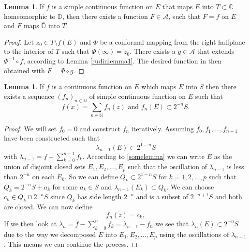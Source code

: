 \documentclass[a4paper,12pt,twoside,BCOR=10mm]{scrbook}
\theoremstyle{definition}
\theoremstyle{definition}
\newtheorem{lemma}[theorem]{Lemma}
\theoremstyle{definition}
\begin{document}
\begin{lemma}
\label{rudinlemma2}
If $f$ is a simple continuous function on $E$ that maps $E$ into $T \subset \mathbb{C}$ homeomorphic to $\overline{\mathbb{D}}$, then there exists a function $F \in \mathcal{A}$, such that $F = f$ on $E$ and $F$ maps $\overline{\mathbb{D}}$ into $T$.
\end{lemma}
\begin{proof}
Let $z_0 \in T \setminus f(E)$ and $\Phi$ be a conformal mapping from the right halfplane to the interior of $T$ such that $\Phi(\infty) = z_0$.
There exists a $g \in \mathcal{A}$ that extends $\Phi^{-1} \circ f$, according to Lemma \ref{rudinlemma1}.
The desired function in then obtained with $F = \Phi \circ g$.
\end{proof}
\begin{lemma}
\label{rudinlemma3}
If $f$ is a continuous function on $E$ which maps $E$ into $S$ then there exists a sequence $(f_n)_{n \in \mathbb{N}}$ of simple continuous function on $E$ such that
\[
	f(x) = \sum_{n \in \mathbb{N}} f_n(z)
	\text{ and }
	f_n(E) \subset 2^{-n}S.
\]
\end{lemma}
\begin{proof}
We will set $f_0 = 0$ and construct $f_n$ iteratively.
Assuming $f_0, f_1, ..., f_{n - 1}$ have been constructed such that
\[
	\lambda_{n - 1}(E) \subset 2^{1 - n}S
\]
with $\lambda_{n - 1} = f - \sum_{k = 0}^{n - 1}f_k$.
According to \ref{somelemma} we can write $E$ as the union of disjoint closed sets $E_1, E_2, ..., E_p$ such that the oscillation of $\lambda_{n - 1}$ is less than $2^{-n}$ on each $E_k$.
So we can define $Q_k \subset 2^{1 - n}S$ for $k = 1, 2, ..., p$ such that $Q_k = 2^{-n}S + a_k$ for some $a_k \in S$ and $\lambda_{n - 1}(E_k) \subset Q_k$.
We can choose $c_k \in Q_k \cap 2^{-n}S$ since $Q_k$ has side length $2^{-n}$ and is a subset of $2^{-n + 1}S$ and both are closed.
We can now define
\[
	f_n(z) = c_k, \tag*{$z \in E_k,\ k = 1, 2, ..., p$.}
\]
If we then look at $\lambda_n = f - \sum_{k = 0}^nf_k = \lambda_{n - 1} - f_n$ we see that $\lambda_n(E) \subset 2^{-n}S$ due to the way we decomposed $E$ into $E_1, E_2, ..., E_p$ using the oscillations of $\lambda_{n - 1}$.
This means we can continue the process.
\end{proof}
\end{document}
